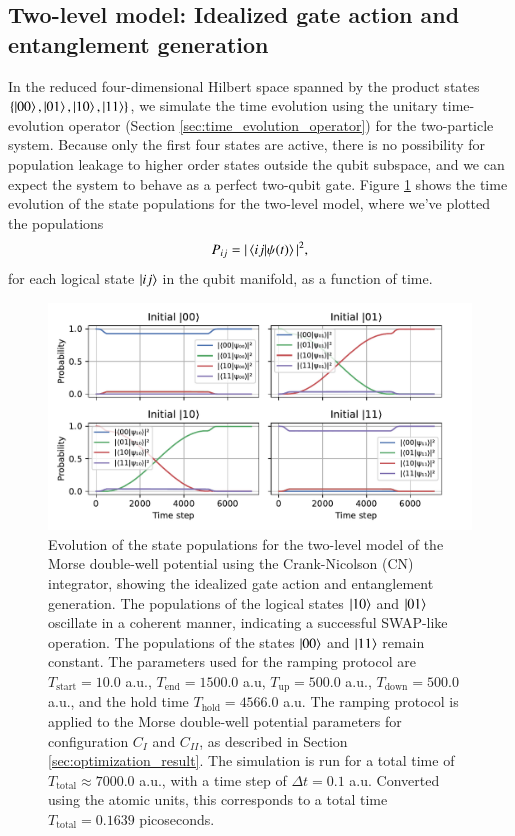 \documentclass{subfiles}
\begin{document}
\subsection{Two-level model: Idealized gate action and entanglement generation}
In the reduced four-dimensional Hilbert space spanned by the product states $\{\ket{00}, \ket{01}, \ket{10}, \ket{11}\}$, we simulate the time evolution using the unitary time-evolution operator (Section \ref{sec:time_evolution_operator}) for the two-particle system. Because only the first four states are active, there is no possibility for population leakage to higher order states outside the qubit subspace, and we can expect the system to behave as a perfect two-qubit gate. Figure \ref{fig:time_evolution_2_basefunctions} shows the time evolution of the state populations for the two-level model, where we've plotted the populations 
\begin{align*}
    P_{ij} = |\braket{ij| \psi(t)}|^2,
\end{align*}
for each logical state $\ket{ij}$ in the qubit manifold, as a function of time.
\begin{figure}[h!]
    \centering
    \includegraphics[width=1.0\textwidth]{figs/time_evolution_2_basefunctions_2506_SWAP.pdf}
    \caption{Evolution of the state populations for the two-level model of the Morse double-well potential using the Crank-Nicolson (CN) integrator, showing the idealized gate action and entanglement generation. The populations of the logical states $\ket{10}$ and $\ket{01}$ oscillate in a coherent manner, indicating a successful SWAP-like operation. The populations of the states $\ket{00}$ and $\ket{11}$ remain constant. The parameters used for the ramping protocol are $T_{\text{start}} = 10.0$ a.u., $T_{\text{end}} = 1500.0$ a.u, $T_{\text{up}} = 500.0$ a.u., $T_{\text{down}} = 500.0$ a.u., and the hold time $T_{\text{hold}} = 4566.0$ a.u. The ramping protocol is applied to the Morse double-well potential parameters for configuration $C_I$ and $C_{II}$, as described in Section \ref{sec:optimization_result}. The simulation is run for a total time of $T_{\text{total}} \approx 7000.0$ a.u., with a time step of $\Delta t = 0.1$ a.u. Converted using the atomic units, this corresponds to a total time $T_{\text{total}}=0.1639$ picoseconds.}
    \label{fig:time_evolution_2_basefunctions}
\end{figure}
\end{document}
